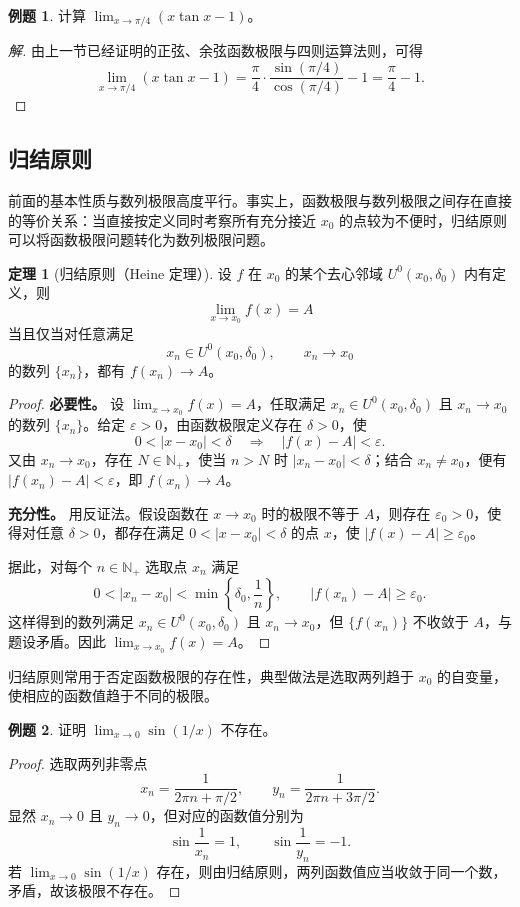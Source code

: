 \documentclass[UTF8,fontset=fandol,a4paper,12pt]{ctexart}
\newcommand{\Nplus}{\mathbb N_{+}}
\newcommand{\U}{U}
\theoremstyle{definition}
\newtheorem{theorem}{定理}
\newtheorem*{example}{例题}
\begin{document}
\begin{example}
计算 $\displaystyle\lim_{x\to\pi/4}(x\tan x-1)$。
\end{example}
\begin{proof}[解]
由上一节已经证明的正弦、余弦函数极限与四则运算法则，可得
\[
 \lim_{x\to\pi/4}(x\tan x-1)
 =\frac\pi4\cdot\frac{\sin(\pi/4)}{\cos(\pi/4)}-1
 =\frac\pi4-1.
\]
\end{proof}

\subsection*{归结原则}
前面的基本性质与数列极限高度平行。事实上，函数极限与数列极限之间存在直接的等价关系：当直接按定义同时考察所有充分接近 $x_0$ 的点较为不便时，归结原则可以将函数极限问题转化为数列极限问题。

\begin{theorem}[归结原则（Heine 定理）]
设 $f$ 在 $x_0$ 的某个去心邻域 $\U^0(x_0,\delta_0)$ 内有定义，则
\[
 \lim_{x\to x_0}f(x)=A
\]
当且仅当对任意满足
\[
 x_n\in\U^0(x_0,\delta_0),\qquad x_n\to x_0
\]
的数列 $\{x_n\}$，都有 $f(x_n)\to A$。
\end{theorem}
\begin{proof}
\textbf{必要性。} 设 $\lim_{x\to x_0}f(x)=A$，任取满足 $x_n\in\U^0(x_0,\delta_0)$ 且 $x_n\to x_0$ 的数列 $\{x_n\}$。给定 $\varepsilon>0$，由函数极限定义存在 $\delta>0$，使
\[
 0<|x-x_0|<\delta\quad\Longrightarrow\quad |f(x)-A|<\varepsilon.
\]
又由 $x_n\to x_0$，存在 $N\in\Nplus$，使当 $n>N$ 时 $|x_n-x_0|<\delta$；结合 $x_n\ne x_0$，便有 $|f(x_n)-A|<\varepsilon$，即 $f(x_n)\to A$。

\textbf{充分性。} 用反证法。假设函数在 $x\to x_0$ 时的极限不等于 $A$，则存在 $\varepsilon_0>0$，使得对任意 $\delta>0$，都存在满足 $0<|x-x_0|<\delta$ 的点 $x$，使 $|f(x)-A|\ge\varepsilon_0$。

据此，对每个 $n\in\Nplus$ 选取点 $x_n$ 满足
\[
 0<|x_n-x_0|<\min\left\{\delta_0,\frac1n\right\},\qquad |f(x_n)-A|\ge\varepsilon_0.
\]
这样得到的数列满足 $x_n\in\U^0(x_0,\delta_0)$ 且 $x_n\to x_0$，但 $\{f(x_n)\}$ 不收敛于 $A$，与题设矛盾。因此 $\lim_{x\to x_0}f(x)=A$。
\end{proof}

归结原则常用于否定函数极限的存在性，典型做法是选取两列趋于 $x_0$ 的自变量，使相应的函数值趋于不同的极限。

\begin{example}
证明 $\displaystyle\lim_{x\to0}\sin(1/x)$ 不存在。
\end{example}
\begin{proof}
选取两列非零点
\[
 x_n=\frac1{2\pi n+\pi/2},\qquad
 y_n=\frac1{2\pi n+3\pi/2}.
\]
显然 $x_n\to0$ 且 $y_n\to0$，但对应的函数值分别为
\[
 \sin\frac1{x_n}=1,\qquad \sin\frac1{y_n}=-1.
\]
若 $\lim_{x\to0}\sin(1/x)$ 存在，则由归结原则，两列函数值应当收敛于同一个数，矛盾，故该极限不存在。
\end{proof}
\end{document}
